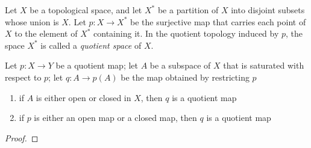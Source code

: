 \begin{definition}
    Let $X$ be a topological space, and let $X^*$ be a partition of $X$ into disjoint subsets whose union is $X$. Let $p:X\to X^*$ be the surjective map that carries each point of $X$ to the element of $X^*$ containing it. In the quotient topology induced by $p$, the space $X^*$ is called a \textit{quotient space} of $X$.
\end{definition}

\begin{theorem}
    Let $p:X\to Y$ be a quotient map; let $A$ be a subspace of $X$ that is saturated with respect to $p$; let $q:A\to p(A)$ be the map obtained by restricting $p$
    \begin{enumerate}
        \item if $A$ is either open or closed in $X$, then $q$ is a quotient map 
        \item if $p$ is either an open map or a closed map, then $q$ is a quotient map
    \end{enumerate}
\end{theorem}
\begin{proof}
    
\end{proof}